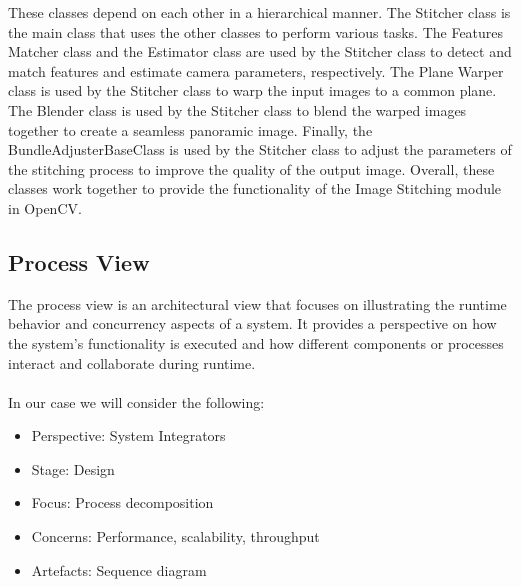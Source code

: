 These classes depend on each other in a hierarchical manner. The Stitcher class is the main class that uses the other classes to perform various tasks. The Features Matcher class and the Estimator class are used by the Stitcher class to detect and match features and estimate camera parameters, respectively. The Plane Warper class is used by the Stitcher class to warp the input images to a common plane. The Blender class is used by the Stitcher class to blend the warped images together to create a seamless panoramic image. Finally, the BundleAdjusterBaseClass is used by the Stitcher class to adjust the parameters of the stitching process to improve the quality of the output image. Overall, these classes work together to provide the functionality of the Image Stitching module in OpenCV.
\pagebreak


\subsection{Process View\label{subSection::ProcessView}}
The process view is an architectural view that focuses on illustrating the runtime behavior and concurrency aspects of a system. It provides a perspective on how the system's functionality is executed and how different components or processes interact and collaborate during runtime.\\\\
     In our case we will consider the following:
     \begin{itemize}
         \item Perspective: System Integrators 
         \item Stage: Design
         \item Focus: Process decomposition
         \item Concerns: Performance, scalability, throughput 
         \item Artefacts: Sequence diagram 
     \end{itemize}
     
